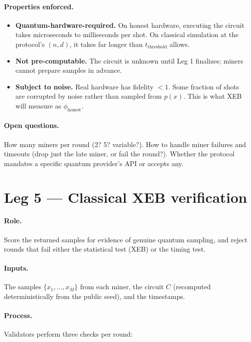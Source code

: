 \documentclass[11pt]{article}
\begin{document}
\paragraph{Properties enforced.}
\begin{itemize}
    \item \textbf{Quantum-hardware-required.} On honest hardware, executing the circuit takes microseconds to milliseconds per shot. On classical simulation at the protocol's $(n, d)$, it takes far longer than $t_{\text{threshold}}$ allows.
    \item \textbf{Not pre-computable.} The circuit is unknown until Leg 1 finalizes; miners cannot prepare samples in advance.
    \item \textbf{Subject to noise.} Real hardware has fidelity $< 1$. Some fraction of shots are corrupted by noise rather than sampled from $p(x)$. This is what XEB will measure as $\phi_{\text{honest}}$.
\end{itemize}

\paragraph{Open questions.} How many miners per round (2? 5? variable?). How to handle miner failures and timeouts (drop just the late miner, or fail the round?). Whether the protocol mandates a specific quantum provider's API or accepts any.

\section{Leg 5 --- Classical XEB verification}

\paragraph{Role.} Score the returned samples for evidence of genuine quantum sampling, and reject rounds that fail either the statistical test (XEB) or the timing test.

\paragraph{Inputs.} The samples $\{x_1, \ldots, x_M\}$ from each miner, the circuit $C$ (recomputed deterministically from the public seed), and the timestamps.

\paragraph{Process.} Validators perform three checks per round:
\end{document}
